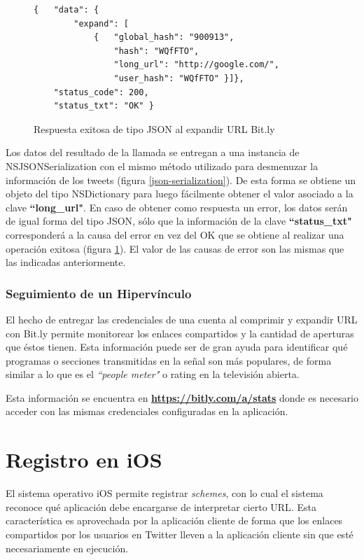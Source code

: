 \begin{figure}[H]
	\centering
\begin{lstlisting}
{   "data": {
        "expand": [
            { 	"global_hash": "900913",
                "hash": "WQfFTO",
                "long_url": "http://google.com/",
                "user_hash": "WQfFTO" }]},
    "status_code": 200,
    "status_txt": "OK" }
\end{lstlisting}
	\caption{Respuesta exitosa de tipo JSON al expandir URL Bit.ly}
	\label{bitly-json-response}
\end{figure}	
Los datos del resultado de la llamada se entregan a una instancia de NSJSONSerialization con el mismo método utilizado para desmenuzar la información de los tweets (figura \ref{json-serialization}). De esta forma se obtiene un objeto del tipo NSDictionary para luego fácilmente obtener el valor asociado a la clave \textbf{\textquotedblleft long\_url"}.
En caso de obtener como respuesta un error, los datos serán de igual forma del tipo JSON, sólo que la información de la clave \textbf{\textquotedblleft status\_txt"} corresponderá a la causa del error en vez del OK que se obtiene al realizar una operación exitosa (figura \ref{bitly-json-response}). El valor de las causas de error son las mismas que las indicadas anteriormente.

		\subsubsection{Seguimiento de un Hipervínculo}		
El hecho de entregar las credenciales de una cuenta al comprimir y expandir URL con Bit.ly permite monitorear los enlaces compartidos y la cantidad de aperturas que éstos tienen. Esta información puede ser de gran ayuda para identificar qué programas o secciones transmitidas en la señal son más populares, de forma similar a lo que es el \textit{\textquotedblleft people meter"} o rating en la televisión abierta.

Esta información se encuentra en \textbf{\url{https://bitly.com/a/stats}} donde es necesario acceder con las mismas credenciales configuradas en la aplicación.

\clearpage
\section{Registro en iOS}
El sistema operativo iOS permite registrar \textit{schemes}, con lo cual el sistema reconoce qué aplicación debe encargarse de interpretar cierto URL. Esta característica es aprovechada por la aplicación cliente de forma que los enlaces compartidos por los usuarios en Twitter lleven a la aplicación cliente sin que esté necesariamente en ejecución.
